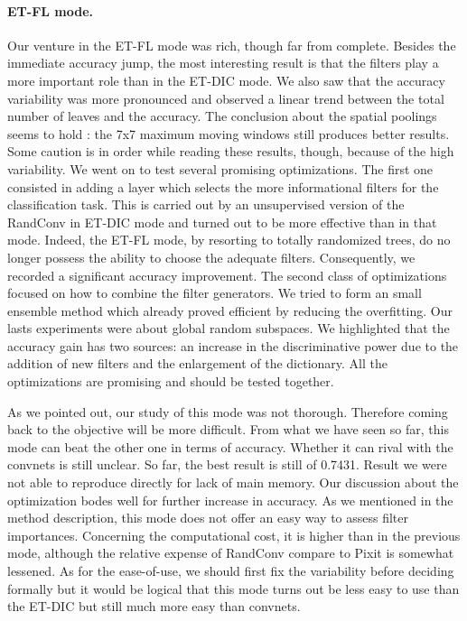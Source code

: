 \documentclass[a4paper]{report}
\newlength{\larg}
\begin{document}
\paragraph{ET-FL mode.}
Our venture in the ET-FL mode was rich, though far from complete. Besides the immediate accuracy jump, the most interesting result is that the filters play a more important role than in the ET-DIC mode. We also saw that the accuracy variability was more pronounced and observed a linear trend between the total number of leaves and the accuracy. The conclusion about the spatial poolings seems to hold : the 7x7 maximum moving windows still produces better results. Some caution is in order while reading these results, though, because of the high variability. We went on to test several promising optimizations. The first one consisted in adding a layer which selects the more informational filters for the classification task. This is carried out by an unsupervised version of the RandConv in ET-DIC mode and turned out to be more effective than in that mode. Indeed, the ET-FL mode, by resorting to totally randomized trees, do no longer possess the ability to choose the adequate filters. Consequently, we recorded a significant accuracy improvement. The second class of optimizations focused on how to combine the filter generators. We tried to form an small ensemble method which already proved efficient by reducing the overfitting. Our lasts experiments were about global random subspaces. We highlighted that the accuracy gain has two sources: an increase in the discriminative power due to the addition of new filters and the enlargement of the dictionary. All the optimizations are promising and should be tested together.
\par
As we pointed out, our study of this mode was not thorough. Therefore coming back to the objective will be more difficult. From what we have seen so far, this mode can beat the other one in terms of accuracy. Whether it can rival with the convnets is still unclear. So far, the best result is still of 0.7431. Result we were not able to reproduce directly for lack of main memory. Our discussion about the optimization bodes well for further increase in accuracy.
As we mentioned in the method description, this mode does not offer an easy way to assess filter importances. Concerning the computational cost, it is higher than in the previous mode, although the relative expense of RandConv compare to Pixit is somewhat lessened. As for the ease-of-use, we should first fix the variability before deciding formally but it would be logical that this mode turns out be less easy to use than the ET-DIC but still much more easy than convnets.
\end{document}
